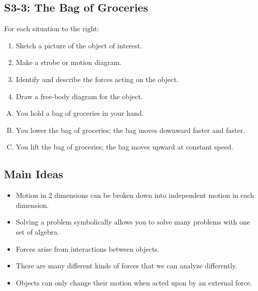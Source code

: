 \documentclass[]{article}
\begin{document}
\begin{PresentSpace}
\vspace{-10pt}
\section*{S3-3: The Bag of Groceries}
\vspace{-10pt}
\begin{multicols}{2}
For each situation to the right:
\begin{enumerate}[(1)]
	\item Sketch a picture of the object of interest.
	\item Make a strobe or motion diagram.
	\item Identify and describe the forces acting on the object.
	\item Draw a free-body diagram for the object.
\end{enumerate}
\begin{enumerate}[(A)]
	\item You hold a bag of groceries in your hand.
	\item You lower the bag of groceries; the bag moves downward faster and faster.
	\item You lift the bag of groceries; the bag moves upward at constant speed.
\end{enumerate}
\end{multicols}
\end{PresentSpace}
\newpage
\begin{TeacherMargin}

\end{TeacherMargin}
\begin{PresentSpace}
\section*{Main Ideas}
\begin{itemize}
	\item Motion in 2 dimensions can be broken down into independent motion in each dimension.
	\item Solving a problem symbolically allows you to solve many problems with one set of algebra.
	\item Forces arise from interactions between objects.
	\item There are many different kinds of forces that we can analyze differently.
	\item Objects can only change their motion when acted upon by an external force.
\end{itemize}
\end{PresentSpace}
\end{document}
